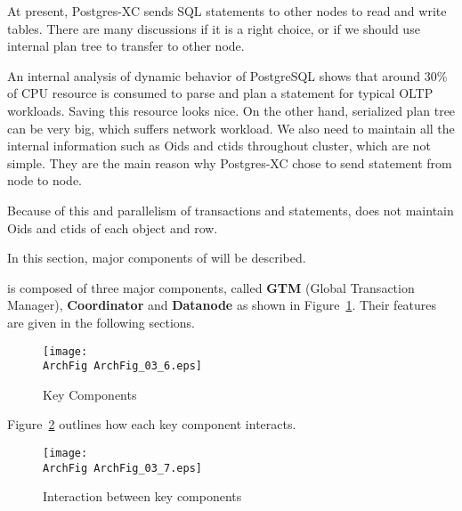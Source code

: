 

  At present, Postgres-XC sends SQL statements to other nodes to read and write tables.
  There are many discussions if it is a right choice,
  or if we should use internal plan tree to transfer to other node.
  
  An internal analysis of dynamic behavior of PostgreSQL shows that
  around 30\% of CPU resource is consumed to parse and plan a statement for typical OLTP workloads.
  Saving this resource looks nice.
  On the other hand, serialized plan tree can be very big, which suffers network workload.
  We also need to maintain all the internal information such as Oids and ctids
  throughout \XC{} cluster, which are not simple.
  They are the main reason why Postgres-XC chose to send statement from node to node.
  
  Because of this and parallelism of transactions and statements,
  \XC{} does not maintain Oids and ctids of each object and row.




  In this section, major components of \XC{} will be described.
  
  \XC{} is composed of three major components, called \textbf{GTM} (Global Transaction Manager),
  \textbf{Coordinator} and \textbf{Datanode} as shown in Figure~\ref{archfig:6}.
  Their features are given in the following sections.
  
  \begin{figure}[htp]
	  \begin{center}
		  \texttt{[image: \\ArchFig ArchFig\_03\_6.eps]}
		  \caption{\label{archfig:6}\XC{} Key Components}
	  \end{center}
  \end{figure}
  
  Figure~\ref{archfig:7} outlines how each key component interacts.
  
  \begin{figure}[htp]
	  \begin{center}
		  \texttt{[image: \\ArchFig ArchFig\_03\_7.eps]}
		  \caption{\label{archfig:7}Interaction between \XC{} key components}
	  \end{center}
  \end{figure}


